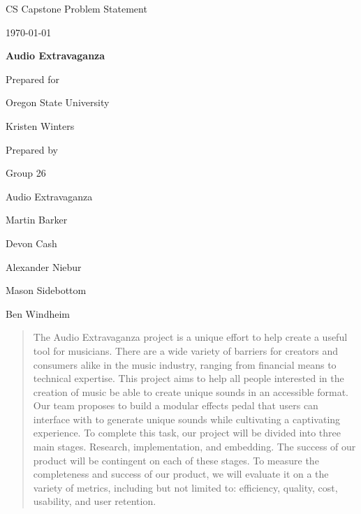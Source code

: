 \documentclass[onecolumn, draftclsnofoot,10pt, compsoc]{IEEEtran}
\def \CapstoneTeamName{Audio Extravaganza}
\def \CapstoneTeamNumber{26}
\def \GroupMemberOne{Martin Barker}
\def \GroupMemberTwo{Devon Cash}
\def \GroupMemberThree{Alexander Niebur}
\def \GroupMemberFour{Mason Sidebottom}
\def \GroupMemberFive{Ben Windheim}
\def \CapstoneProjectName{Audio Extravaganza}
\def \CapstoneSponsorCompany{Oregon State University}
\def \CapstoneSponsorPerson{Kristen Winters}
\def \DocType{Problem Statement
  }
\newcommand{\NameSigPair}[1]{\par
  \makebox[2.75in][r]{#1} \hfil \makebox[3.25in]{\makebox[2.25in]{\hrulefill} \hfill\makebox[.75in]{\hrulefill}}
\par\vspace{-12pt} \textit{\tiny\noindent
  \makebox[2.75in]{} \hfil\makebox[3.25in]{\makebox[2.25in][r]{Signature} \hfill\makebox[.75in][r]{Date}}}}
\renewcommand{\NameSigPair}[1]{#1}
\begin{document}
\begin{titlepage}
    \begin{singlespace}
        \hfill 
        \par\vspace{.2in}
        \centering
        \scshape{
            \huge CS Capstone \DocType \par
            {\large\today}\par
            \vspace{.5in}
            \textbf{\Huge\CapstoneProjectName}\par
            \vfill
            {\large Prepared for}\par
            \Huge \CapstoneSponsorCompany\par
            \vspace{5pt}
            {\Large\NameSigPair{\CapstoneSponsorPerson}\par}
            {\large Prepared by }\par
            Group \CapstoneTeamNumber\par
            \CapstoneTeamName\par 
            \vspace{5pt}
            {\Large
                \NameSigPair{\GroupMemberOne}\par
                \NameSigPair{\GroupMemberTwo}\par
                \NameSigPair{\GroupMemberThree}\par
                \NameSigPair{\GroupMemberFour}\par
                \NameSigPair{\GroupMemberFive}\par
            }
            \vspace{20pt}
        }
        \begin{abstract}
          The Audio Extravaganza project is a unique effort to help create a useful tool for musicians. There are a wide variety of barriers for creators and consumers alike in the music industry, ranging from financial means to technical expertise. This project aims to help all people interested in the creation of music be able to create unique sounds in an accessible format. Our team proposes to build a modular effects pedal that users can interface with to generate unique sounds while cultivating a captivating experience. To complete this task, our project will be divided into three main stages. Research, implementation, and embedding. The success of our product will be contingent on each of these stages. To measure the completeness and success of our product, we will evaluate it on a the variety of metrics, including but not limited to: efficiency, quality, cost, usability, and user retention.
        \end{abstract}     
    \end{singlespace}
\end{titlepage}
\end{document}
